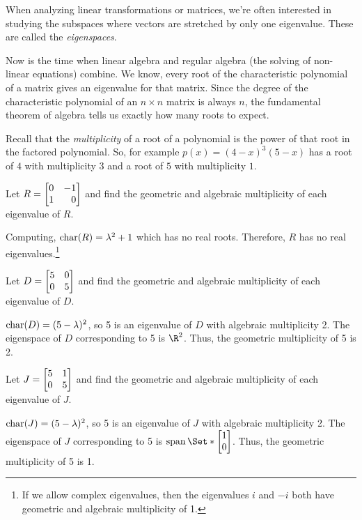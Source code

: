 
When analyzing linear transformations or matrices, we're often interested in
studying the subspaces where vectors are stretched by only one eigenvalue. These 
are called the \emph{eigenspaces}.


Now is the time when linear algebra and regular algebra (the solving of non-linear equations)
combine. We know, every root of the characteristic polynomial of a matrix gives an eigenvalue
for that matrix. Since the degree of the characteristic polynomial of an $n\times n$ matrix
is always $n$, the fundamental theorem of algebra tells us exactly how many roots to expect.

Recall that the \emph{multiplicity} of a root of a polynomial is the power of that root
in the factored polynomial. So, for example $p(x)=(4-x)^3(5-x)$ has a root of $4$ with multiplicity
$3$ and a root of $5$ with multiplicity $1$.

\begin{example}
	Let $R=\mat{0&-1\\1&0}$ and find the geometric and algebraic multiplicity of each eigenvalue of $R$.
	
	Computing, $\operatorname{char}(R)=\lambda^2+1$ which has no real roots. Therefore,
	$R$ has no real eigenvalues.\footnote{ If we allow complex eigenvalues, then the eigenvalues
	$i$ and $-i$ both have geometric and algebraic multiplicity of 1.}
\end{example}

\begin{example}
	Let $D=\mat{5&0\\0&5}$ and find the geometric and algebraic multiplicity of each eigenvalue of $D$.
	
	$\operatorname{char}(D)=(5-\lambda)^2$, so 5 is an eigenvalue of $D$ with algebraic multiplicity 2.
	The eigenspace of $D$ corresponding to 5 is $\R^2$. Thus, the geometric multiplicity of 5 is 2.
\end{example}

\begin{example}
	Let $J=\mat{5&1\\0&5}$ and find the geometric and algebraic multiplicity of each eigenvalue of $J$.
	
	$\operatorname{char}(J)=(5-\lambda)^2$, so 5 is an eigenvalue of $J$ with algebraic multiplicity 2.
	The eigenspace of $J$ corresponding to 5 is $\Span\Set*{\mat{1\\0}}$. Thus, the geometric 
	multiplicity of 5 is 1.
\end{example}

